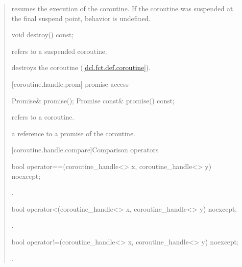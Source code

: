 \begin{quote}
\begin{itemdescr}
  \pnum
  \effects resumes the execution of the coroutine. If the coroutine was suspended
  at the final suspend point, behavior is undefined.
\end{itemdescr}

\begin{itemdecl}
  void destroy() const;
\end{itemdecl}
\begin{itemdescr}
  \pnum
  \precondition {} refers to a suspended coroutine.
  
  \pnum
  \effects destroys the coroutine (\ref{dcl.fct.def.coroutine}).
\end{itemdescr}

[coroutine.handle.prom]{ promise access}
\begin{itemdecl}
  Promise& promise();		
  Promise const& promise() const;
\end{itemdecl}

\begin{itemdescr}
  \pnum
  \precondition {} refers to a coroutine.
  
  \pnum
  \returns a reference to a promise of the coroutine.
\end{itemdescr}

[coroutine.handle.compare]{Comparison operators}

\begin{itemdecl}
  bool operator==(coroutine_handle<> x, coroutine_handle<> y) noexcept;
\end{itemdecl}

\begin{itemdescr}
  \pnum
  \returns {}.
\end{itemdescr}

\begin{itemdecl}
  bool operator<(coroutine_handle<> x, coroutine_handle<> y) noexcept;
\end{itemdecl}

\begin{itemdescr}
  \pnum
  \returns {}.
\end{itemdescr}

\begin{itemdecl}
  bool operator!=(coroutine_handle<> x, coroutine_handle<> y) noexcept;
\end{itemdecl}

\begin{itemdescr}
  \pnum
  \returns {}.
\end{itemdescr}


\end{quote}
